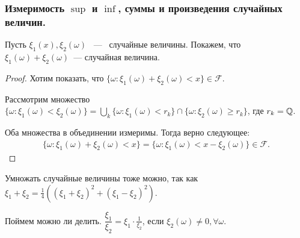 \subsubsection{Измеримость \texorpdfstring{$\sup$}{sup} и \texorpdfstring{$\inf$}{inf}, суммы и произведения случайных величин.}
\begin{property}
    Пусть $\xi_1(x), \xi_2(\omega)$ ~---~ случайные величины. Покажем, что $\xi_1(\omega ) + \xi_2(\omega)$~--- случайная величина.
\end{property}
\begin{proof}
    Хотим показать, что $\{\omega : \xi_1(\omega) + \xi_2(\omega) < x \} \in \mathcal{F}$.

    \noindent Рассмотрим множество $\{ \omega : \xi_1(\omega) < \xi_2(\omega) \} = \bigcup\limits_{k} \{ \omega : \xi_1(\omega) < r_k \} \cap \{\omega: \xi_2(\omega) \ge r_k \}$, где $r_k = \mathbb{Q}$.

    \noindent Оба множества в объединении измеримы. Тогда верно следующее: 
    \begin{gather*}
        \{\omega : \xi_1(\omega) + \xi_2(\omega) < x \} = \{ \omega : \xi_1(\omega) < x - \xi_2(\omega) \} \in \mathcal{F}.
    \end{gather*}
\end{proof}

\begin{property}
    Умножать случайные величины тоже можно, так как $\xi_1 + \xi_2 = \frac{1}{4}((\xi_1 + \xi_2)^2 + (\xi_1 - \xi_2)^2)$.
\end{property}

\begin{property}
    Поймем можно ли делить. $\dfrac{\xi_1}{\xi_2} = \xi_1 \cdot \frac{1}{\xi_2}$, если $\xi_2(\omega) \neq 0, \forall \omega$.
\end{property}


